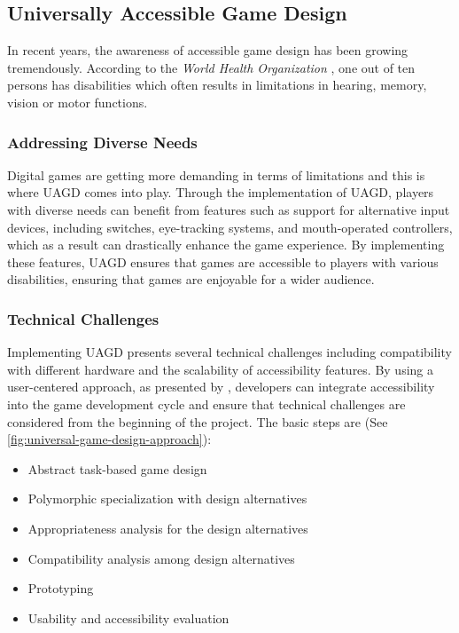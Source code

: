 \documentclass[sigconf,natbib=false,10pt]{acmart}
\begin{document}
	\subsection{Universally Accessible Game Design} \label{subsec:uagd}
	In recent years, the awareness of accessible game design has been growing tremendously.
	According to the \emph{World Health Organization} \cite{world_health_organization_international_2004}, one out of ten persons has disabilities which often results in limitations in hearing, memory, vision or motor functions.
	
	\subsubsection{Addressing Diverse Needs}
	Digital games are getting more demanding in terms of limitations and this is where UAGD comes into play.
	Through the implementation of UAGD, players with diverse needs can benefit from features such as support for alternative input devices, including switches, eye-tracking systems, and mouth-operated controllers, which as a result can drastically enhance the game experience.
	By implementing these features, UAGD ensures that games are accessible to players with various disabilities, ensuring that games are enjoyable for a wider audience.
	
	\subsubsection{Technical Challenges}
	Implementing UAGD presents several technical challenges including compatibility with different hardware and the scalability of accessibility features.
	By using a user-centered approach, as presented by \textcite{grammenos_unified_2007}, developers can integrate accessibility into the game development cycle and ensure that technical challenges are considered from the beginning of the project.
	The basic steps are (See \autoref{fig:universal-game-design-approach}):
	
	\begin{itemize}
		\setlength\itemsep{0.5em}
		\item Abstract task-based game design
		\item Polymorphic specialization with design alternatives
		\item Appropriateness analysis for the design alternatives
		\item Compatibility analysis among design alternatives
		\item Prototyping
		\item Usability and accessibility evaluation
	\end{itemize}
	
\end{document}
